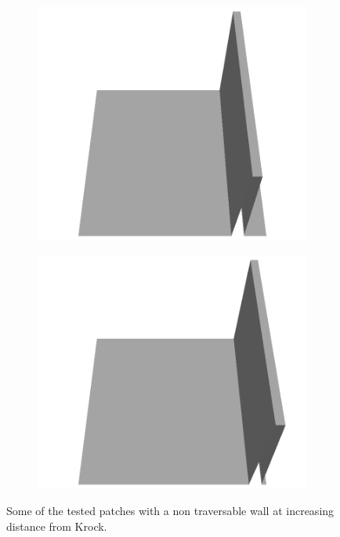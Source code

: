 \documentclass[../document.tex]{subfiles}
\begin{document}
\begin{figure}[H]
\begin{subfigure}[b]{0.24\textwidth}
    \includegraphics[width=\linewidth]{../img/5/custom_patches/walls_front/all/20-3d.png}
    \end{subfigure}
    \begin{subfigure}[b]{0.24\textwidth}
    \includegraphics[width=\linewidth]{../img/5/custom_patches/walls_front/all/05-3d.png}
    \end{subfigure}
    \caption{Some of the tested patches with a non traversable wall at increasing distance from Krock.}
    \end{figure}
\end{document}
